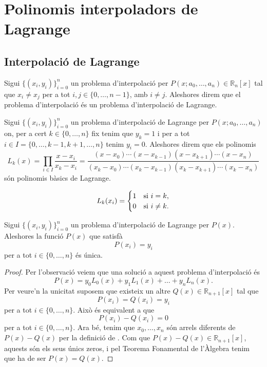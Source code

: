 \documentclass[../Apunts.tex]{subfiles}
\begin{document}
	\section{Polinomis interpoladors de Lagrange}
	\subsection{Interpolació de Lagrange}
	\begin{definition}
		\label{def:problema d'interpolació de Lagrange}
		Sigui \(\{(x_{i},y_{i})\}_{i=0}^{n}\) un problema d'interpolació per \(P(x;a_{0},\dots,a_{n})\in\mathbb{R}_{n}[x]\) tal que \(x_{i}\neq x_{j}\) per a tot \(i,j\in\{0,\dots,n-1\}\), amb \(i\neq j\). Aleshores direm que el problema d'interpolació és un problema d'interpolació de Lagrange.
	\end{definition}
	\begin{definition}
		\label{def:problema polinomis bàsics de Lagrange}
		Sigui \(\{(x_{i},y_{i})\}_{i=0}^{n}\) un problema d'interpolació de Lagrange per \(P(x;a_{0},\dots,a_{n})\) on, per a cert \(k\in\{0,\dots,n\}\) fix tenim que \(y_{k}=1\) i per a tot \(i\in I=\{0,\dots,k-1,k+1,\dots,n\}\) tenim \(y_{i}=0\). Aleshores direm que els polinomis
		\[L_{k}(x)=\prod_{i\in I}\frac{x-x_{i}}{x_{k}-x_{i}}=\frac{(x-x_{0})\cdots(x-x_{k-1})(x-x_{k+1})\cdots(x-x_{n})}{(x_{k}-x_{0})\cdots(x_{k}-x_{k-1})(x_{k}-x_{k+1})\cdots(x_{k}-x_{n})}\]
		són polinomis bàsics de Lagrange.
	\end{definition}
	\begin{observation}\label{obs:polinomis bàsics de Lagrange cases}
		\[L_{k}(x_{i})=\begin{cases}
		1&\textup{si }i=k,\\
		0&\textup{si }i\neq k.
		\end{cases}\]
	\end{observation}
	\begin{proposition}\label{prop:unicitat interpolació de Lagrange}
		Sigui \(\{(x_{i},y_{i})\}_{i=0}^{n}\) un problema d'interpolació de Lagrange per \(P(x)\). Aleshores la funció \(P(x)\) que satisfà
		\[P(x_{i})=y_{i}\]
		per a tot \(i\in\{0,\dots,n\}\) és única.
		\begin{proof}
			Per l'observació  veiem que una solució a aquest problema d'interpolació és
			\[P(x)=y_{0}L_{0}(x)+y_{1}L_{1}(x)+\dots+y_{n}L_{n}(x).\]
			Per veure'n la unicitat suposem que existeix un altre \(Q(x)\in\mathbb{R}_{n+1}[x]\) tal que
			\[P(x_{i})=Q(x_{i})=y_{i}\]
			per a tot \(i\in\{0,\dots,n\}\). Això és equivalent a que
			\[P(x_{i})-Q(x_{i})=0\]
			per a tot \(i\in\{0,\dots,n\}\). Ara bé, tenim que \(x_{0},\dots,x_{n}\) són arrels diferents de \(P(x)-Q(x)\) per la definició de . Com que \(P(x)-Q(x)\in\mathbb{R}_{n+1}[x]\), aquests són els seus únics zeros, i pel Teorema Fonamental de l'Àlgebra tenim que ha de ser \(P(x)=Q(x)\). %
		\end{proof}
	\end{proposition}
\end{document}
